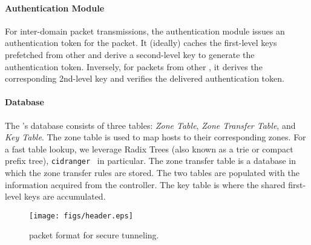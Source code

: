\paragraph{Authentication Module}
For inter-domain packet transmissions, the authentication module issues an 
authentication token for the packet. It (ideally) caches the first-level keys prefetched
from other \tps and derive a second-level key to generate the authentication token. 
Inversely, for packets from other \tps, it derives the corresponding 2nd-level key
and verifies the delivered authentication token.

\paragraph{Database}
The \tp's database consists of three tables: \textit{Zone Table}, \textit{Zone Transfer 
Table}, and \textit{Key Table}. The zone table is used to map hosts to their corresponding 
zones. For a fast table lookup, we leverage Radix Trees (also known as a trie or compact prefix 
tree), \texttt{cidranger}~\cite{cidranger} in particular. The zone transfer table is a database 
in which the zone transfer rules are stored. The two tables are populated with the information 
acquired from the controller. The key table is where the shared first-level keys are 
accumulated. 

\begin{figure}[t]
	\begin{center}
		\texttt{[image: figs/header.eps]}
	\end{center}
	\caption{\name packet format for secure tunneling.}
	\label{fig:header}
\end{figure}


